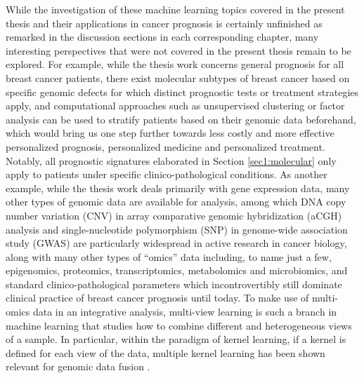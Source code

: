 While the investigation of these machine learning topics covered in the present thesis and their applications in cancer prognosis is certainly unfinished as remarked in the discussion sections in each corresponding chapter, many interesting perspectives that were not covered in the present thesis remain to be explored. For example, while the thesis work concerns general prognosis for all breast cancer patients, there exist molecular subtypes of breast cancer based on specific genomic defects for which distinct prognostic tests or treatment strategies apply, and computational approaches such as unsupervised clustering or factor analysis \cite{Hastie2009Elements} can be used to stratify patients based on their genomic data beforehand, which would bring us one step further towards less costly and more effective personalized prognosis, personalized medicine and personalized treatment. Notably, all prognostic signatures elaborated in Section \ref{sec1:molecular} only apply to patients under specific clinico-pathological conditions. As another example, while the thesis work deals primarily with gene expression data, many other types of genomic data are available for analysis, among which DNA copy number variation (CNV) in array comparative genomic hybridization (aCGH) analysis and single-nucleotide polymorphism (SNP) in genome-wide association study (GWAS) are particularly widespread in active research in cancer biology, along with many other types of ``omics'' data including, to name just a few, epigenomics, proteomics, transcriptomics, metabolomics and microbiomics, and standard clinico-pathological parameters which incontrovertibly still dominate clinical practice of breast cancer prognosis until today. To make use of multi-omics data in an integrative analysis, multi-view learning \cite{Sun2013survey} is such a branch in machine learning that studies how to combine different and heterogeneous views of a sample. In particular, within the paradigm of kernel learning, if a kernel is defined for each view of the data, multiple kernel learning \cite{Goenen2011Multiple} has been shown relevant for genomic data fusion \cite{Lanckriet2004statistical}.


